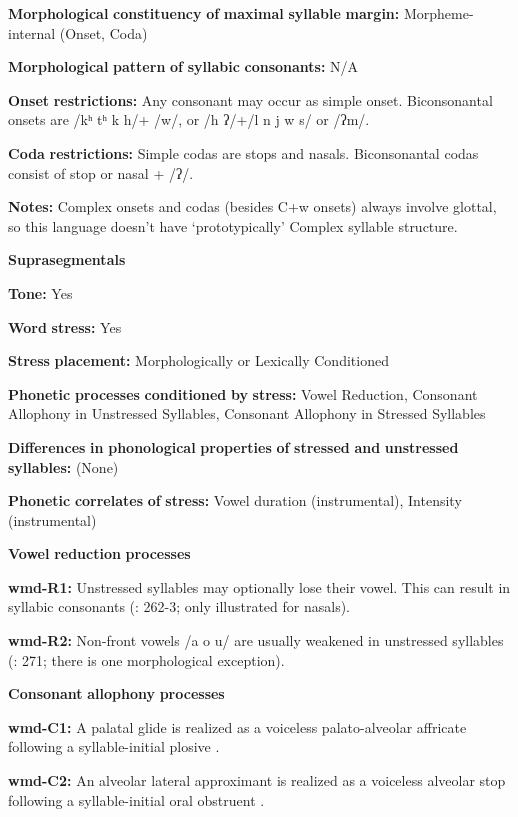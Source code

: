 \begin{styleBody}
\textbf{Morphological} \textbf{constituency} \textbf{of} \textbf{maximal} \textbf{syllable} \textbf{margin:} Morpheme-internal (Onset, Coda)

\textbf{Morphological} \textbf{pattern} \textbf{of} \textbf{syllabic} \textbf{consonants:} N/A

\textbf{Onset} \textbf{restrictions:} Any consonant may occur as simple onset. Biconsonantal onsets are /kʰ tʰ k h/+ /w/, or /h ʔ/+/l n j w s/ or /ʔm/.

\textbf{Coda} \textbf{restrictions:} Simple codas are stops and nasals. Biconsonantal codas consist of stop or nasal + /ʔ/.

\textbf{Notes:} Complex onsets and codas (besides C+w onsets) always involve glottal, so this language doesn’t have ‘prototypically’ Complex syllable structure.

\textbf{Suprasegmentals}

\textbf{Tone:} Yes

\textbf{Word} \textbf{stress:} Yes

\textbf{Stress} \textbf{placement:} Morphologically or Lexically Conditioned

\textbf{Phonetic} \textbf{processes} \textbf{conditioned} \textbf{by} \textbf{stress:} Vowel Reduction, Consonant Allophony in Unstressed Syllables, Consonant Allophony in Stressed Syllables

\textbf{Differences} \textbf{in} \textbf{phonological} \textbf{properties} \textbf{of} \textbf{stressed} \textbf{and} \textbf{unstressed} \textbf{syllables:} (None)

\textbf{Phonetic} \textbf{correlates} \textbf{of} \textbf{stress:} Vowel duration (instrumental), Intensity (instrumental)

\textbf{Vowel} \textbf{reduction} \textbf{processes}

\textbf{wmd-R1:} Unstressed syllables may optionally lose their vowel. This can result in syllabic consonants (\citealt{Eberhard2009}: 262-3; only illustrated for nasals).

\textbf{wmd-R2:} Non-front vowels /a o u/ are usually weakened in unstressed syllables (\citealt{Eberhard2009}: 271; there is one morphological exception).

\textbf{Consonant} \textbf{allophony} \textbf{processes}

\textbf{wmd-C1:} A palatal glide is realized as a voiceless palato-alveolar affricate following a syllable-initial plosive \citep[94]{Eberhard2009}.

\textbf{wmd-C2:} An alveolar lateral approximant is realized as a voiceless alveolar stop following a syllable-initial oral obstruent \citep[92]{Eberhard2009}.


\end{styleBody}
